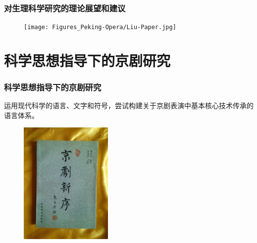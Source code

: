 \frame
{
	\frametitle{对生理科学研究的理论展望和建议}
{\fontsize{6.2pt}{4.2pt}}
\begin{figure}[h!] 
\centering
\vspace{-0.08in}
\texttt{[image: Figures\_Peking-Opera/Liu-Paper.jpg]}
\label{Liu-Paper}
\end{figure}
}

\section{科学思想指导下的京剧研究}
\frame
{
	\frametitle{科学思想指导下的京剧研究}
	运用现代科学的语言、文字和符号，尝试构建关于京剧表演中基本核心技术传承的语言体系。
\begin{figure}[h!]
\centering
\vspace{-0.1in}
\includegraphics[height=0.58\textwidth,width=0.40\textwidth,viewport=100 85 660 875,clip]{Figures_Peking-Opera/Liu_Xinxu.jpg}
\label{Liu_Xinxu}
\end{figure}
}

